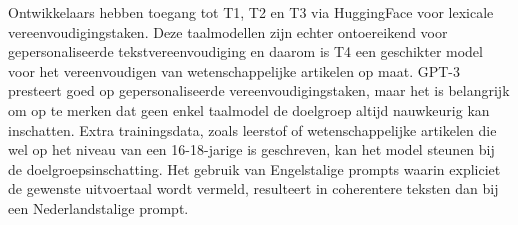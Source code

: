 \medspace


Ontwikkelaars hebben toegang tot T1, T2 en T3 via HuggingFace voor lexicale vereenvoudigingstaken. Deze taalmodellen zijn echter ontoereikend voor gepersonaliseerde tekstvereenvoudiging en daarom is T4 een geschikter model voor het vereenvoudigen van wetenschappelijke artikelen op maat. GPT-3 presteert goed op gepersonaliseerde vereenvoudigingstaken, maar het is belangrijk om op te merken dat geen enkel taalmodel de doelgroep altijd nauwkeurig kan inschatten. Extra trainingsdata, zoals leerstof of wetenschappelijke artikelen die wel op het niveau van een 16-18-jarige is geschreven, kan het model steunen bij de doelgroepsinschatting. Het gebruik van Engelstalige prompts waarin expliciet de gewenste uitvoertaal wordt vermeld, resulteert in coherentere teksten dan bij een Nederlandstalige prompt.